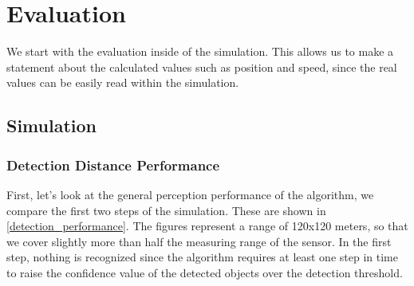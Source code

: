 \documentclass[11pt,oneside,openright]{mpreport}
\begin{document}
\chapter{Evaluation}


We start with the evaluation inside of the simulation. This allows us to make a statement about the calculated values such as position and speed, since the real values can be easily read within the simulation.

\section{Simulation}

\subsection{Detection Distance Performance}

First, let's look at the general perception performance of the algorithm, we compare the first two steps of the simulation.
These are shown in \cref{detection_performance}. The figures represent a range of 120x120 meters, so that we cover slightly more than half the measuring range of the sensor.
In the first step, nothing is recognized since the algorithm requires at least one step in time to raise the confidence value of the detected objects over the detection threshold.
\end{document}
